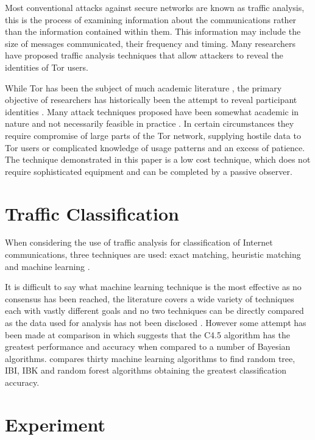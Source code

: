 \documentclass[conference]{IEEEtran}
\begin{document}
Most conventional attacks against secure networks are known as traffic analysis,
this is the process of examining information about the communications rather
than the information contained within them. This information may include the
size of messages communicated, their frequency and timing. Many researchers have
proposed traffic analysis techniques that allow attackers to reveal the
identities of Tor users.

While Tor has been the subject of much academic literature
\parencite{Hopper:2007p347,Murdoch:2007p320,Herrmann:2009p1189}, the primary
objective of researchers has historically been the attempt to reveal
participant identities \parencite[3]{Murdoch:2005p325}.  Many attack techniques
proposed have been somewhat academic in nature and not necessarily feasible in
practice \parencite{Raccoon:2008fk}. In certain circumstances they require
compromise of large parts of the Tor network, supplying hostile data to Tor
users or complicated knowledge of usage patterns and an excess of patience. The
technique demonstrated in this paper is a low cost technique, which does not
require sophisticated equipment and can be completed by a passive observer.

\section{Traffic Classification}

When considering the use of traffic analysis for classification of Internet
communications, three techniques are used: exact matching, heuristic matching
and machine learning \parencite{Zhang:2009p1188}.

It is difficult to say what machine learning technique is the most effective as
no consensus has been reached, the literature covers a wide variety of
techniques each with vastly different goals and no two techniques can be
directly compared as the data used for analysis has not been disclosed
\parencite{Kim:2007p3867}. However some attempt has been made at comparison in
\textcite{Williams:2006p3849} which suggests that the C4.5 algorithm has the
greatest performance and accuracy when compared to a number of Bayesian
algorithms. \textcite{Mohd:2009p6484} compares thirty machine learning
algorithms to find random tree, IBI, IBK and random forest algorithms
obtaining the greatest classification accuracy.

\section{Experiment}
\end{document}
